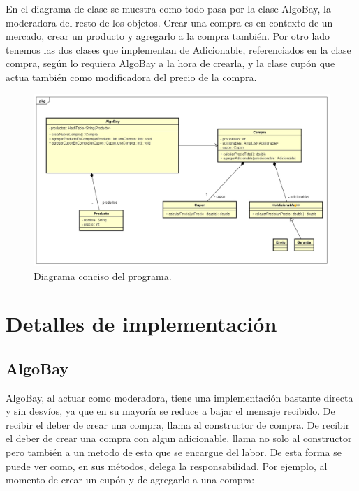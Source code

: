 \documentclass[titlepage,a4paper]{article}
\begin{document}
En el diagrama de clase se muestra como todo pasa por la clase AlgoBay, la moderadora del resto de los objetos. Crear una compra es en contexto de un mercado, crear un producto y agregarlo a la compra también. Por otro lado tenemos las dos clases que implementan de Adicionable, referenciados en la clase compra, según lo requiera AlgoBay a la hora de crearla, y la clase cupón que actua también como modificadora del precio de la compra.

\begin{figure}[H]
\centering
\includegraphics[width=1\textwidth]{0clases.jpg} 
\caption{\label{fig:class01}Diagrama conciso del programa.}
\end{figure}

\section{Detalles de implementación}\label{sec:implementacion}

\subsection{AlgoBay}
AlgoBay, al actuar como moderadora, tiene una implementación bastante directa y sin desvíos, ya que en su mayoría se reduce a bajar el mensaje recibido. De recibir el deber de crear una compra, llama al constructor de compra. De recibir el deber de crear una compra con algun adicionable, llama no solo al constructor pero también a un metodo de esta que se encargue del labor. De esta forma se puede ver como, en sus métodos, delega la responsabilidad. Por ejemplo, al momento de crear un cupón y de agregarlo a una compra:
\end{document}
